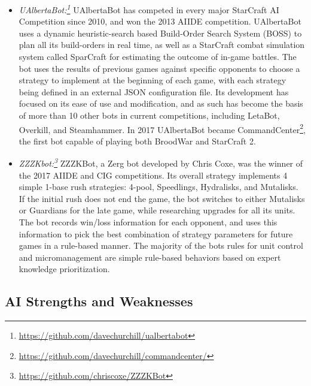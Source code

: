 \begin{itemize}
  \item {\em UAlbertaBot:\footnote{\url{https://github.com/davechurchill/ualbertabot}}} UAlbertaBot has competed in every major StarCraft AI Competition since 2010, and won the 2013 AIIDE competition. UAlbertaBot uses a dynamic heuristic-search based Build-Order Search System (BOSS) to plan all its build-orders in real time, as well as a StarCraft combat simulation system called SparCraft for estimating the outcome of in-game battles. The bot uses the results of previous games against specific opponents to choose a strategy to implement at the beginning of each game, with each strategy being defined in an external JSON configuration file. Its development has focused on its ease of use and modification, and as such has become the basis of more than 10 other bots in current competitions, including LetaBot, Overkill, and Steamhammer. In 2017 UAlbertaBot became CommandCenter\footnote{\url{https://github.com/davechurchill/commandcenter/}}, the first bot capable of playing both BroodWar and StarCraft 2.
  
  
  \item {\em ZZZKbot:\footnote{\url{https://github.com/chriscoxe/ZZZKBot}}} ZZZKBot, a Zerg bot developed by Chris Coxe, was the winner of the 2017 AIIDE and CIG competitions. Its overall strategy implements 4 simple 1-base rush strategies: 4-pool, Speedlings, Hydralisks, and Mutalisks. If the initial rush does not end the game, the bot switches to either Mutalisks or Guardians for the late game, while researching upgrades for all its units. The bot records win/loss information for each opponent, and uses this information to pick the best combination of strategy parameters for future games in a rule-based manner. The majority of the bots rules for unit control and micromanagement are simple rule-based behaviors based on expert knowledge prioritization.

\end{itemize}

\subsection{AI Strengths and Weaknesses}

